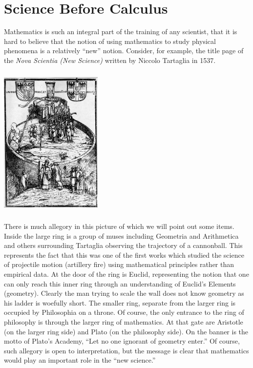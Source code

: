 \chapter{Science Before Calculus}
\label{chapt:pre-calculus}
\aptta{}
Mathematics is such an integral part of the training of any scientist,
that it is hard to believe that the notion of using mathematics to
study physical phenomena is a relatively ``new'' notion.  Consider, for
example, the title page of the \emph{Nova Scientia (New Science)} written by
Niccolo Tartaglia in 1537. 

\centerline{\includegraphics*[height=3in,width=2in]{Figures/NovaScientia}}

There is much allegory in this picture of which we will point out some
items.  Inside the large ring is a group of muses including Geometria
and Arithmetica and others surrounding Tartaglia observing the
trajectory of a cannonball.  This represents the fact that this was
one of the first works which studied the science of projectile motion
(artillery fire) using mathematical principles rather than empirical
data.  At the door of the ring is Euclid, representing the notion that
one can only reach this inner ring through an understanding of
Euclid's Elements (geometry).  Clearly the man trying to scale the
wall does not know geometry as his ladder is woefully short.  The
smaller ring, separate from the larger ring is occupied by Philosophia
on a throne.  Of course, the only entrance to the ring of philosophy
is through the larger ring of mathematics.    At that gate are
Aristotle (on the larger ring side) and Plato (on the philosophy
side).  On the banner is the motto of Plato's Academy, ``Let no one
ignorant of geometry enter.''  Of course, such allegory is open to
interpretation, but the message is clear that mathematics would play
an important role in the ``new science.''

